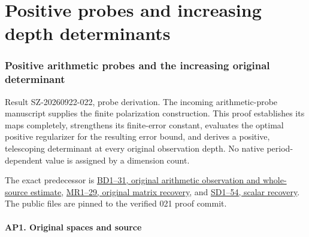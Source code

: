 \documentclass[11pt]{article}
\begin{document}
\clearpage\part{Positive probes and increasing depth determinants}
\section{Positive arithmetic probes and the increasing original determinant}\label{positive-arithmetic-probes-and-the-increasing-original-determinant}

Result SZ-20260922-022, probe derivation. The incoming arithmetic-probe manuscript supplies the finite polarization construction. This proof establishes its maps completely, strengthens its finite-error constant, evaluates the optimal positive regularizer for the resulting error bound, and derives a positive, telescoping determinant at every original observation depth. No native period-dependent value is assigned by a dimension count.

The exact predecessor is \href{https://github.com/KokunoYumeto/zeta-function-research-reader/blob/e40b46fde72c245dd79ef5691f59c21d6cbf0c75/workbenches/splitzero-tandem/continuations/20260922-original-observation-recovery/BOUNDED_DEGREE_PROOFS.md}{BD1--31, original arithmetic observation and whole-source estimate}, \href{https://github.com/KokunoYumeto/zeta-function-research-reader/blob/e40b46fde72c245dd79ef5691f59c21d6cbf0c75/workbenches/splitzero-tandem/continuations/20260922-original-observation-recovery/MATRIX_RECOVERY_PROOFS.md}{MR1--29, original matrix recovery}, and \href{https://github.com/KokunoYumeto/zeta-function-research-reader/blob/e40b46fde72c245dd79ef5691f59c21d6cbf0c75/workbenches/splitzero-tandem/continuations/20260922-original-observation-recovery/SCALAR_RECOVERY_PROOFS.md}{SD1--54, scalar recovery}. The public files are pinned to the verified 021 proof commit.

\subsection{AP1. Original spaces and source}\label{ap1.-original-spaces-and-source}
\end{document}
